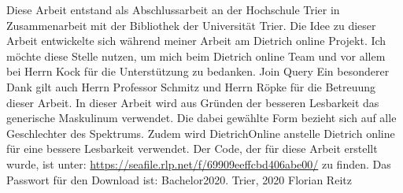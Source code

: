 \preface

Diese Arbeit entstand als Abschlussarbeit an der Hochschule Trier in Zusammenarbeit mit der Bibliothek der Universität Trier. 
\newline
\newline
Die Idee zu dieser Arbeit entwickelte sich während meiner Arbeit am Dietrich online Projekt. Ich möchte diese Stelle nutzen, um mich beim Dietrich online Team und vor allem bei Herrn Kock für die Unterstützung zu bedanken.
\newline
Join
Query
\newline
Ein besonderer Dank gilt auch Herrn Professor Schmitz und Herrn Röpke für die Betreuung dieser Arbeit.
\newline
\newline
In dieser Arbeit wird aus Gründen der besseren Lesbarkeit das generische Maskulinum verwendet. Die dabei gewählte Form bezieht sich auf alle Geschlechter des Spektrums. 
\newline
Zudem wird DietrichOnline anstelle Dietrich online für eine bessere Lesbarkeit verwendet.
\newline
\newline
Der Code, der für diese Arbeit erstellt wurde, ist unter: \url{https://seafile.rlp.net/f/69909eeffcbd406abe00/} zu finden. Das Passwort für den Download ist: Bachelor2020.
\newline
\newline
Trier, 2020
\newline
\noindent Florian Reitz